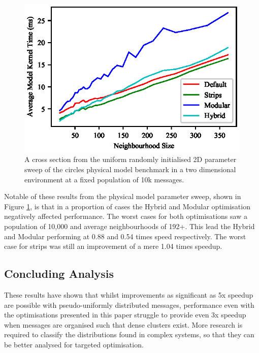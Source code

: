 \begin{figure}[!t]
\centering
\includegraphics[width=\linewidth]{../resources/results/2d/circles_10kmessage.eps}
\caption{\label{fig:graph-2d-circles-10kmessage}A cross section from the uniform randomly initialised 2D parameter sweep of the circles physical model benchmark in a two dimensional environment at a fixed population of 10k messages.}
\end{figure}
    Notable of these results from the physical model parameter sweep, shown in Figure \ref{fig:graph-2d-circles-10kmessage}, is that in a proportion of cases the Hybrid and Modular optimisation negatively affected performance. The worst cases for both optimisations saw a population of 10,000 and average neighbourhoods of 192+. This lead the Hybrid and Modular performing at 0.88 and 0.54 times speed respectively. The worst case for strips was still an improvement of a mere 1.04 times speedup.
    
  \subsection{Concluding Analysis}
    These results have shown that whilst improvements as significant as 5x speedup are possible with pseudo-uniformly distributed messages, performance even with the optimisations presented in this paper struggle to provide even 3x speedup when messages are organised such that dense clusters exist. More research is required to classify the distributions found in complex systems, so that they can be better analysed for targeted optimisation.

